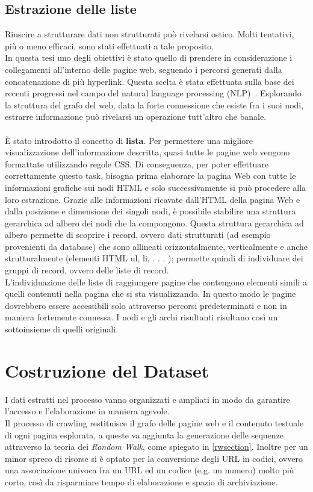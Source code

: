 \subsection{Estrazione delle liste}
\label{liste}
Riuscire a strutturare dati non strutturati può rivelarsi ostico. Molti tentativi, più o meno efficaci, sono stati effettuati a tale proposito.
\\
In questa tesi uno degli obiettivi è stato quello di prendere in considerazione i collegamenti all'interno delle pagine web, seguendo i percorsi generati dalla concatenazione di più hyperlink. Questa scelta è stata effettuata sulla base dei recenti progressi nel campo del natural language processing (NLP)~\cite{Turian10}. Esplorando la struttura del grafo del web, data la forte connessione che esiste fra i suoi nodi, estrarre informazione può rivelarsi un operazione tutt'altro che banale. 
\\\\
È stato introdotto il concetto di \textbf{lista}. 
Per permettere una migliore visualizzazione dell’informazione descritta, quasi tutte le pagine web vengono formattate utilizzando regole CSS. Di conseguenza, per poter effettuare correttamente questo task, bisogna prima elaborare la pagina Web con tutte le informazioni grafiche sui nodi HTML e solo successivamente si può procedere alla loro estrazione. Grazie alle informazioni ricavate dall’HTML della pagina Web e dalla posizione e dimensione dei singoli nodi, è possibile stabilire una struttura gerarchica ad albero dei nodi che la compongono. Questa struttura gerarchica ad albero permette di scoprire i record, ovvero dati strutturati (ad esempio provenienti da database) che sono allineati orizzontalmente, verticalmente e anche strutturalmente (elementi HTML ul, li, . . . ); permette quindi di individuare dei gruppi di record, ovvero delle liste di record.
\\
L’individuazione delle liste di raggiungere pagine che contengono elementi simili a quelli contenuti nella pagina che si sta visualizzando. 
In questo modo le pagine dovrebbero essere accessibili solo attraverso percorsi predeterminati e non in maniera fortemente connessa. I nodi e gli archi risultanti risultano così un sottoinsieme di quelli originali.

\section{Costruzione del Dataset}
I dati estratti nel processo vanno organizzati e ampliati in modo da garantire l'accesso e l'elaborazione in maniera agevole.
\\
Il processo di crawling restituisce il grafo delle pagine web e il contenuto testuale di ogni pagina esplorata, a queste va aggiunta la generazione delle sequenze attraverso la teoria dei \textit{Random Walk}, come spiegato in \ref{rwsection}. Inoltre per un minor spreco di risorse si è optato per la conversione degli URL in codici, ovvero una associazione univoca fra un URL ed un codice (e.g. un numero) molto più corto, così da risparmiare tempo di elaborazione e spazio di archiviazione.

